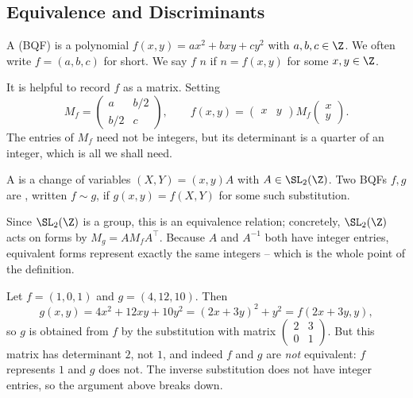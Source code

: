 \subsection{Equivalence and Discriminants}

\begin{definition}
	A  (BQF) is a polynomial $f(x,y) = ax^2 + bxy + cy^2$ with $a, b, c \in \Z$. We often write $f = (a,b,c)$ for short. We say $f$  $n$ if $n = f(x,y)$ for some $x, y \in \Z$.
\end{definition}

It is helpful to record $f$ as a matrix. Setting
$$
M_f = \begin{pmatrix} a & b/2 \\ b/2 & c\end{pmatrix}, \qquad f(x,y) = \begin{pmatrix} x & y \end{pmatrix} M_f \begin{pmatrix} x \\ y\end{pmatrix}.
$$
The entries of $M_f$ need not be integers, but its determinant is a quarter of an integer, which is all we shall need.

\begin{definition}
	A  is a change of variables $(X, Y) = (x, y)A$ with $A \in \SL_2(\Z)$. Two BQFs $f, g$ are , written $f \sim g$, if $g(x,y) = f(X, Y)$ for some such substitution.
\end{definition}

Since $\SL_2(\Z)$ is a group, this is an equivalence relation; concretely, $\SL_2(\Z)$ acts on forms by $M_g = A M_f A^\intercal$. Because $A$ and $A^{-1}$ both have integer entries, equivalent forms represent exactly the same integers -- which is the whole point of the definition.

\begin{example}
	Let $f = (1, 0, 1)$ and $g = (4, 12, 10)$. Then
	$$
	g(x,y) = 4x^2 + 12xy + 10y^2 = (2x + 3y)^2 + y^2 = f(2x + 3y, y),
	$$
	so $g$ is obtained from $f$ by the substitution with matrix $\left(\begin{smallmatrix} 2 & 3 \\ 0 & 1\end{smallmatrix}\right)$. But this matrix has determinant $2$, not $1$, and indeed $f$ and $g$ are \emph{not} equivalent: $f$ represents $1$ and $g$ does not. The inverse substitution does not have integer entries, so the argument above breaks down.
\end{example}

